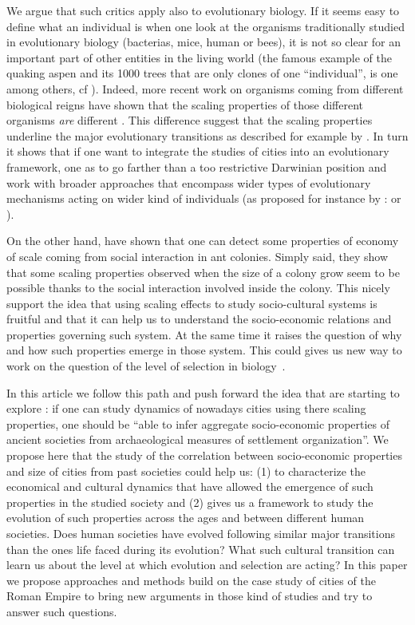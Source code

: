 \documentclass[a4paper,11pt]{article}
\begin{document}
We argue that such critics apply also to evolutionary biology. If it seems easy to define what an individual is when one look at the organisms traditionally studied in evolutionary biology (bacterias, mice, human or bees), it is not so clear for an important part of other entities in the living world (the famous example of the quaking aspen and its 1000 trees that are only clones of one ``individual'', is one among others, cf \cite{bouchard2011darwinismwithoutpopulationsamoreinclusiveunderstandingofsotf}). Indeed, more recent work on organisms coming from different biological reigns have shown that the scaling properties of those different organisms \emph{are} different \citep{delong2010shiftsinmetabolicscalingproductionandefficiencyacrossmajorevolutionarytransitionsoflife}. This difference suggest that the scaling properties underline the major evolutionary transitions as described for example by \cite{maynardsmith1997major}. In turn it shows that if one want to integrate the studies of cities into an evolutionary framework, one as to go farther than a too restrictive Darwinian position and work with broader approaches that encompass wider types of evolutionary mechanisms acting on wider kind of individuals (as proposed for instance by : \cite{godfrey2009darwinian} or \cite{jablonka2014evolution}). 

On the other hand, \cite{hou2010energeticbasisofcoloniallivinginsocialinsects} have shown that one can detect some properties of economy of scale coming from social interaction in ant colonies. Simply said, they show that some scaling properties observed when the size of a colony grow seem to be possible thanks to the social interaction involved inside the colony. This nicely support the idea that using scaling effects to study socio-cultural systems is fruitful and that it can help us to understand the socio-economic relations and properties governing such system. At the same time it raises the question of why and how such properties emerge in those system. This could gives us new way to work on the question of the level of selection in biology~\citep{okasha2006evolution}.


In this article we follow this path and push forward the idea that \cite{ortman2014theprehistoryofurbanscaling} are starting to explore : if one can study dynamics of nowadays cities using there scaling properties, one should be ``able to infer aggregate socio-economic properties of ancient societies from archaeological measures of settlement organization''. We propose here that the study of the correlation between socio-economic properties and size of cities from past societies could help us: (1) to characterize the economical and cultural dynamics that have allowed the emergence of such properties in the studied society and (2) gives us a framework to study the evolution of such properties across the ages and between different human societies. Does human societies have evolved following similar major transitions than the ones life faced during its evolution? What such cultural transition can learn us about the level at which evolution and selection are acting?  In this paper we propose approaches and methods build on the case study of cities of the Roman Empire to bring new arguments in those kind of studies and try to answer such questions.




\end{document}
